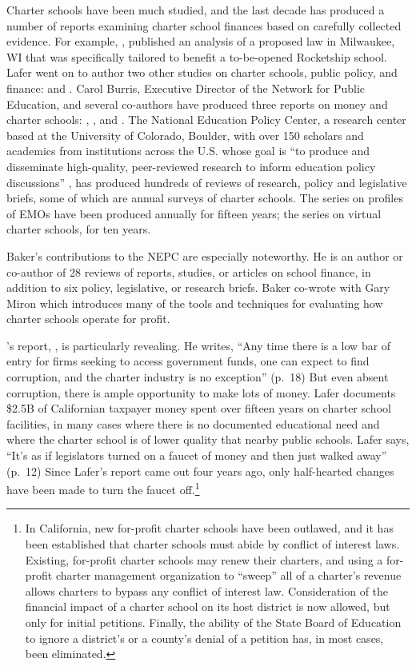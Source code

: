 Charter schools have been much studied, and the last decade has produced a number of reports examining charter school finances based on carefully collected evidence. For example, \textcite{Lafer2014}, published an analysis of a proposed law in Milwaukee, WI \parencite{Lafer2014} that was specifically tailored to benefit a to-be-opened Rocketship school. Lafer went on to author two other studies on charter schools, public policy, and finance:  \parencite{Lafer2017} and  \parencite{Lafer2018}. Carol Burris, Executive Director of the Network for Public Education, and several co-authors have produced three reports on money and charter schools: \textcite{Burris.Pfleger2020}, \textcite{Burris.Bryant2020}, and \textcite{Burris.Cimarusti2021}. The National Education Policy Center, a research center based at the University of Colorado, Boulder, with over 150 scholars and academics from institutions across the U.S. whose goal is ``to produce and disseminate high-quality, peer-reviewed research to inform education policy discussions'' \parencite{NEPC2021}, has produced hundreds of reviews of research, policy and legislative briefs, some of which are annual surveys of charter schools. The series on profiles of EMOs have been produced annually for fifteen years; the series on virtual charter schools, for ten years.

Baker's contributions to the NEPC are especially noteworthy. He is an author or co-author of 28 reviews of reports, studies, or articles on school finance, in addition to six policy, legislative, or research briefs. Baker co-wrote with Gary Miron  \parencite{Baker.Miron2015} which introduces many of the tools and techniques for evaluating how charter schools operate for profit.

\citeauthor{Lafer2017}'s report, , is particularly revealing. He writes,
``Any time there is a low bar of entry for firms seeking to access government funds, one can expect to find corruption, and the charter industry is no exception'' (p.~18) But even absent corruption, there is ample opportunity to make lots of money. Lafer documents \$2.5B of Californian taxpayer money spent over fifteen years on charter school facilities, in many cases where there is no documented educational need and where the charter school is of lower quality that nearby public schools. Lafer says, ``It's as if legislators turned on a faucet of money and then just walked away'' (p.~12) Since Lafer's report came out four years ago, only half-hearted changes have been made to turn the faucet off.\footnote{In California, new for-profit charter schools have been outlawed, and it has been established that charter schools must abide by conflict of interest laws. Existing, for-profit charter schools may renew their charters, and using a for-profit charter management organization to ``sweep'' all of a charter's revenue allows charters to bypass any conflict of interest law. Consideration of the financial impact of a charter school on its host district is now allowed, but only for initial petitions. Finally, the ability of the State Board of Education to ignore a district's or a county's denial of a petition has, in most cases, been eliminated.}

